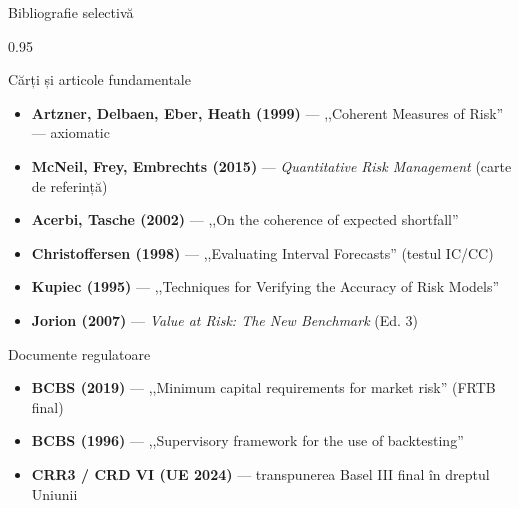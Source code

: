 \documentclass[9pt, aspectratio=169, t]{beamer}
\begin{document}
\begin{frame}[shrink=10]{Bibliografie selectivă}
\begin{cminipage}{0.95\textwidth}
\begin{block}{Cărți și articole fundamentale}
\begin{itemize}\setlength{\itemsep}{0pt}
    \item \textbf{Artzner, Delbaen, Eber, Heath (1999)} --- ,,Coherent Measures of Risk'' --- axiomatic
    \item \textbf{McNeil, Frey, Embrechts (2015)} --- \textit{Quantitative Risk Management} (carte de referință)
    \item \textbf{Acerbi, Tasche (2002)} --- ,,On the coherence of expected shortfall''
    \item \textbf{Christoffersen (1998)} --- ,,Evaluating Interval Forecasts'' (testul IC/CC)
    \item \textbf{Kupiec (1995)} --- ,,Techniques for Verifying the Accuracy of Risk Models''
    \item \textbf{Jorion (2007)} --- \textit{Value at Risk: The New Benchmark} (Ed. 3)
\end{itemize}
\end{block}
\vspace{0.15cm}
\begin{block}{Documente regulatoare}
\begin{itemize}\setlength{\itemsep}{0pt}
    \item \textbf{BCBS (2019)} --- ,,Minimum capital requirements for market risk'' (FRTB final)
    \item \textbf{BCBS (1996)} --- ,,Supervisory framework for the use of backtesting''
    \item \textbf{CRR3 / CRD VI (UE 2024)} --- transpunerea Basel III final în dreptul Uniunii
\end{itemize}
\end{block}
\end{cminipage}
\end{frame}
\end{document}
